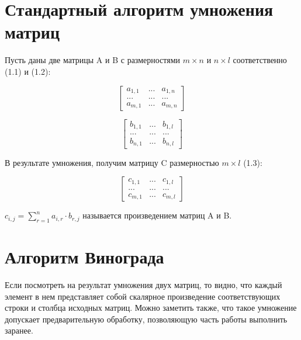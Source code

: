 \documentclass[12pt,a4paper]{report}
\begin{document}
\section{Стандартный алгоритм умножения матриц}

Пусть даны две матрицы A и B с размерностями $m\times n$ и $n\times l$ соответственно (1.1) и (1.2):

\begin{equation}
    \begin{bmatrix} 
        a_{1,1}      & \textrm{...} & a_{1,n} \\
        \textrm{...} & \textrm{...} & \textrm{...} \\
        a_{m,1}      & \textrm{...} & a_{m,n}
    \end{bmatrix}
\end{equation}

\begin{equation}
    \begin{bmatrix} 
        b_{1,1}      & \textrm{...} & b_{1,l} \\
        \textrm{...} & \textrm{...} & \textrm{...} \\
        b_{n,1}      & \textrm{...} & b_{n,l}
    \end{bmatrix}
\end{equation}

\newpage
В результате умножения, получим матрицу C размерностью $m\times l$ (1.3):

\begin{equation}
    \begin{bmatrix} 
        c_{1,1}      & \textrm{...} & c_{1,l} \\
        \textrm{...} & \textrm{...} & \textrm{...} \\
        c_{m,1}      & \textrm{...} & c_{m,l}
    \end{bmatrix}
\end{equation}

$c_{i,j}=\sum\limits_{r=1}^n a_{i,r} \cdot b_{r,j}$ называется произведением матриц A и B.

\section{Алгоритм Винограда}

Если посмотреть на результат умножения двух матриц, то видно, что каждый элемент в нем представляет 
собой скалярное произведение соответствующих строки и столбца исходных матриц. 
Можно заметить также, что такое умножение допускает предварительную обработку, позволяющую часть работы 
выполнить заранее. \\
\end{document}
